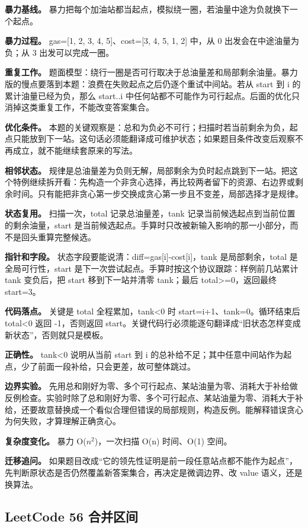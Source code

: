 \textbf{暴力基线。} 暴力把每个加油站都当起点，模拟绕一圈，若油量中途为负就换下一个起点。

\textbf{暴力过程。} gas=[1, 2, 3, 4, 5]、cost=[3, 4, 5, 1, 2] 中，从 0 出发会在中途油量为负；从 3 出发可以完成一圈。

\textbf{重复工作。} 题面模型：绕行一圈是否可行取决于总油量差和局部剩余油量。暴力版的慢点要落到本题：浪费在失败起点之后仍逐个重试中间站。若从 start 到 i 的累计油量已经为负，那么 start..i 中任何站都不可能作为可行起点。后面的优化只消掉这类重复工作，不能改变答案集合。

\textbf{优化条件。} 本题的关键观察是：总和为负必不可行；扫描时若当前剩余为负，起点只能放到下一站。这句话必须能翻译成可维护状态；如果题目条件改变后观察不再成立，就不能继续套原来的写法。

\textbf{相邻状态。} 规律是总油量差为负则无解，局部剩余为负时起点跳到下一站。把这个特例继续拆开看：先构造一个非贪心选择，再比较两者留下的资源、右边界或剩余时间。只有能把非贪心第一步交换成贪心第一步且不变差，局部选择才是规律。

\textbf{状态复用。} 扫描一次，total 记录总油量差，tank 记录当前候选起点到当前位置的剩余油量，start 是当前候选起点。手算时只改被新输入影响的那一小部分，而不是回头重算完整候选。

\textbf{指针和字段。} 状态字段要能说清：diff=gas[i]-cost[i]，tank 是局部剩余，total 是全局可行性，start 是下一次尝试起点。手算时按这个协议跟踪：样例前几站累计 tank 变负后，把 start 移到下一站并清零 tank；最后 total>=0，返回最终 start=3。

\textbf{代码落点。} 关键是 total 全程累加，tank<0 时 start=i+1、tank=0。循环结束后 total<0 返回 -1，否则返回 start。关键代码行必须能逐句翻译成“旧状态怎样变成新状态”，否则就只是模板。

\textbf{正确性。} tank<0 说明从当前 start 到 i 的总补给不足；其中任意中间站作为起点，少了前面一段补给，只会更差，故可整体跳过。

\textbf{边界实验。} 先用总和刚好为零、多个可行起点、某站油量为零、消耗大于补给做反例检查。实验时除了总和刚好为零、多个可行起点、某站油量为零、消耗大于补给，还要故意替换成一个看似合理但错误的局部规则，构造反例。能解释错误贪心为何失败，才算理解正确贪心。

\textbf{复杂度变化。} 暴力 O(\ensuremath{n^{2}})，一次扫描 O(n) 时间、O(1) 空间。

\textbf{迁移追问。} 如果题目改成“它的领先性证明是前一段任意站点都不能作为起点”，先判断原状态是否仍然覆盖新答案集合，再决定是微调边界、改 value 语义，还是换算法。

\subsection{LeetCode 56 合并区间}

